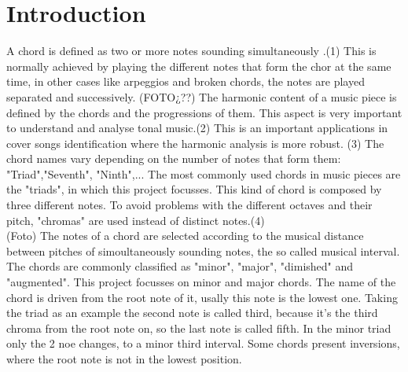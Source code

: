 \section{Introduction}
\label{sec:intro}

A chord is defined as two or more notes sounding simultaneously	.(1) This is normally achieved by playing the different notes that form the chor at the same time, in other cases like arpeggios and broken chords, the notes are played separated and successively. (FOTO¿??) The harmonic content of a music piece is defined by the chords and the progressions of them. This aspect is very important to understand and analyse tonal music.(2) This is an important applications in cover songs identification where the harmonic analysis is more robust. (3)  The chord names vary depending on the number of notes that form them: "Triad","Seventh", "Ninth",... The most commonly used chords in music pieces are the "triads", in which this project focusses. This kind of chord is composed by three different notes. To avoid problems with the different octaves and their pitch, "chromas" are used instead of distinct notes.(4) \\(Foto) The notes of a chord are selected according to the musical distance between pitches of simoultaneously sounding notes, the so called musical interval. The chords are commonly classified as "minor", "major", "dimished" and "augmented". This project focusses on minor and major chords. The name of the chord is driven from the root note of it, usally this note is the lowest one. Taking the triad as an example the second note is called third, because it's the third chroma from the root note on, so the last note is called fifth. In the minor triad only the 2 noe changes, to a minor third interval. Some chords present inversions, where the root note is not in the lowest position.